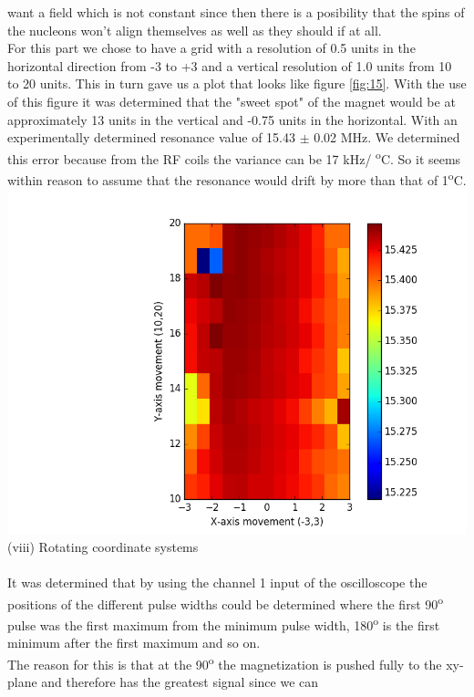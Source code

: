 \documentclass{article}
\begin{document}
{\begin{multicols}{2}
want a field which is not constant since then there is a posibility that the 
spins of the nucleons won't align themselves as well as they should if at all.
\\
For this part we chose to have a grid with a resolution of 0.5 units in the 
horizontal direction from -3 to +3 and a vertical resolution of 1.0 units from 
10 to 20 units. This in turn gave us a plot that looks like figure 
\ref{fig:15}. With the 
use of this figure it was determined that the "sweet spot" of the magnet would 
be at approximately 13 units in the vertical and -0.75 units in the horizontal. 
With an experimentally determined resonance value of 15.43 $\pm$ 0.02 MHz. We 
determined this error because from the RF coils the variance can be 17 kHz/
\textsuperscript{o}C. So it seems within reason to assume that the resonance 
would drift by more than that of 1\textsuperscript{o}C.
\center
\includegraphics[width=\linewidth]{pic-for-report/magnet-colorplot.png}
\label{fig:15}
\justify
(viii) Rotating coordinate systems \\
\\
It was determined that by using the channel 1 input of the oscilloscope the 
positions of the different pulse widths could be determined where the first 
90\textsuperscript{o} pulse was the first maximum from the minimum pulse width, 
180\textsuperscript{o} is the first minimum after the first maximum and so on.
\\
The reason for this is that at the 90\textsuperscript{o} the magnetization is 
pushed fully to the xy-plane and therefore has the greatest signal since we can 

\end{multicols}}
\end{document}

